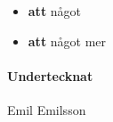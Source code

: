 \documentclass[a4paper, 12pt]{article}
\begin{document}
\begin{itemize}
  \setlength\itemsep{0.2em}
  \item \textbf{att} något
  \item \textbf{att} något mer
\end{itemize}


\paragraph{Undertecknat} Emil Emilsson

\end{document}
